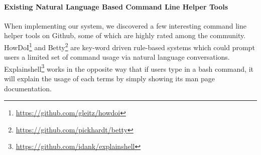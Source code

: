 
\paragraph{Existing Natural Language Based Command Line Helper Tools} When implementing our system, we discovered a few interesting command line helper tools on Github, some of which are highly rated among the community. HowDoI\footnote{\url{https://github.com/gleitz/howdoi}} and Betty\footnote{\url{https://github.com/pickhardt/betty}} are key-word driven rule-based systems which could prompt users a limited set of command usage via natural language conversations. Explainshell\footnote{\url{https://github.com/idank/explainshell}} works in the opposite way that if users type in a bash command, it will explain the usage of each terms by simply showing its man page documentation.

